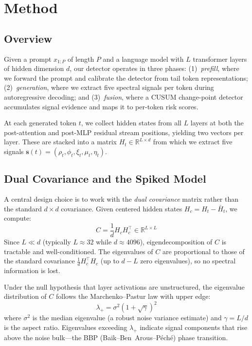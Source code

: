 \documentclass{article}
\begin{document}
\section{Method}
\label{sec:method}

\subsection{Overview}

Given a prompt $x_{1:P}$ of length $P$ and a language model with $L$ transformer layers of hidden dimension $d$, our detector operates in three phases: (1)~\emph{prefill}, where we forward the prompt and calibrate the detector from tail token representations; (2)~\emph{generation}, where we extract five spectral signals per token during autoregressive decoding; and (3)~\emph{fusion}, where a CUSUM change-point detector accumulates signal evidence and maps it to per-token risk scores.

At each generated token $t$, we collect hidden states from all $L$ layers at both the post-attention and post-MLP residual stream positions, yielding two vectors per layer. These are stacked into a matrix $H_t \in \mathbb{R}^{L \times d}$ from which we extract five signals $\bm{s}(t) = (\rho_t, \phi_t, \xi_t, \mu_t, \eta_t)$.

\subsection{Dual Covariance and the Spiked Model}

A central design choice is to work with the \emph{dual covariance} matrix rather than the standard $d \times d$ covariance. Given centered hidden states $H_c = H_t - \bar{H}_t$, we compute:
\begin{equation}
    C = \frac{1}{d} H_c H_c^\top \in \mathbb{R}^{L \times L}
    \label{eq:dual-cov}
\end{equation}
Since $L \ll d$ (typically $L \approx 32$ while $d \approx 4096$), eigendecomposition of $C$ is tractable and well-conditioned. The eigenvalues of $C$ are proportional to those of the standard covariance $\frac{1}{d} H_c^\top H_c$ (up to $d - L$ zero eigenvalues), so no spectral information is lost.

Under the null hypothesis that layer activations are unstructured, the eigenvalue distribution of $C$ follows the Marchenko--Pastur law with upper edge:
\begin{equation}
    \lambda_+ = \sigma^2 \left(1 + \sqrt{\gamma}\right)^2
    \label{eq:mp-edge}
\end{equation}
where $\sigma^2$ is the median eigenvalue (a robust noise variance estimate) and $\gamma = L/d$ is the aspect ratio. Eigenvalues exceeding $\lambda_+$ indicate signal components that rise above the noise bulk---the BBP (Baik--Ben~Arous--P\'{e}ch\'{e}) phase transition.
\end{document}
